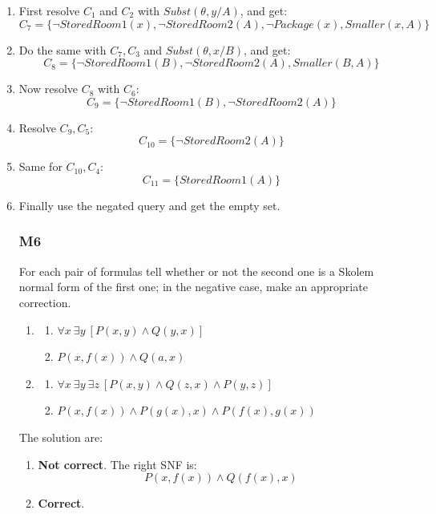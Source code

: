 \documentclass[10pt,a4paper]{article}
\newcommand{\braces}[1]{%
  \lbrace{#1}\rbrace}
\newcommand{\subst}[1]{Subst(\theta,#1)}
\begin{document}
\begin{enumerate}
\item First resolve $C_1$ and $C_2$ with $\subst{y/A}$, and get:
\[C_7=\braces{\neg StoredRoom1(x) , \neg StoredRoom2(A) , \neg Package(x)  , Smaller(x,A)}\]

\item Do the same with $C_7,C_3$ and $\subst{x/B}$, and get: 
\[C_8=\braces{\neg StoredRoom1(B) , \neg StoredRoom2(A) , Smaller(B,A)}\]

\item Now resolve $C_8$ with $C_6$:
\[C_9=\braces{\neg StoredRoom1(B) , \neg StoredRoom2(A)}\]

\item Resolve $C_9, C_5$:
\[C_{10}=\braces{\neg StoredRoom2(A)}\]

\item Same for $C_{10},C_4$:
\[C_{11}=\braces{StoredRoom1(A)}\]

\item Finally use the negated query and get the empty set.


\subsubsection{M6}
For each pair of formulas tell whether or not the second one is a Skolem normal form of the first one; in the negative case, make an appropriate correction.
\begin{enumerate}[label=(\alph*)]
\item 
	\begin{enumerate}
	\item $\forall x\ \exists y\ [P(x,y) \wedge Q(y,x)]$
	\item $ P(x,f(x)) \wedge Q(a,x)$
	\end{enumerate}
\item 
\begin{enumerate}
	\item $\forall x\ \exists y\ \exists z\ [P(x,y) \wedge Q(z,x) \wedge P(y,z)]$
	\item $ P(x,f(x))\wedge P(g(x),x) \wedge P(f(x),g(x))$
	\end{enumerate}
\end{enumerate}

The solution are:
\begin{enumerate}[label=(\alph*)]
\item \textbf{Not correct}. The right SNF is:
\[P(x,f(x)) \wedge Q(f(x),x)\]
\item \textbf{Correct}.
\end{enumerate}



\end{enumerate}
\end{document}
